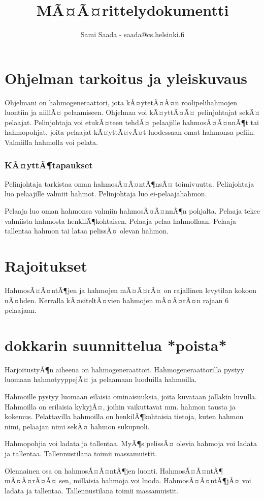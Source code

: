 \documentclass[gradu,emptyfirstpagenumber]{tktltiki}
\begin{document}
\title{MÃ¤Ã¤rittelydokumentti}
\author{Sami Saada - saada@cs.helsinki.fi}

\pagestyle{headings}

\maketitle

\chapter{Ohjelman tarkoitus ja yleiskuvaus}

Ohjelmani on hahmogeneraattori, jota kÃ¤ytetÃ¤Ã¤n roolipelihahmojen luontiin ja niillÃ¤ pelaamiseen. Ohjelmaa voi kÃ¤yttÃ¤Ã¤ pelinjohtajat sekÃ¤ pelaajat. Pelinjohtaja voi etukÃ¤teen tehdÃ¤ pelaajille hahmosÃ¤Ã¤nnÃ¶t tai hahmopohjat, joita pelaajat kÃ¤yttÃ¤vÃ¤t luodessaan omat hahmonsa peliin. Valmiilla hahmolla voi pelata.

\subsection{KÃ¤yttÃ¶tapaukset}

Pelinjohtaja tarkistaa oman hahmosÃ¤Ã¤ntÃ¶nsÃ¤ toimivuutta. Pelinjohtaja luo pelaajille valmiit hahmot. Pelinjohtaja luo ei-pelaajahahmon.

Pelaaja luo oman hahmonsa valmiin hahmosÃ¤Ã¤nnÃ¶n pohjalta. Pelaaja tekee valmiista hahmosta henkilÃ¶kohtaisen. Pelaaja pelaa hahmollaan. Pelaaja tallentaa hahmon tai lataa pelissÃ¤ olevan hahmon.

\chapter{Rajoitukset}

HahmosÃ¤Ã¤ntÃ¶jen ja hahmojen mÃ¤Ã¤rÃ¤ on rajallinen levytilan kokoon nÃ¤hden. Kerralla kÃ¤siteltÃ¤vien hahmojen mÃ¤Ã¤rÃ¤n rajaan 6 pelaajaan.

\chapter{dokkarin suunnittelua *poista*}

HarjoitustyÃ¶n aiheena on hahmogeneraattori. Hahmogeneraattorilla pystyy luomaan hahmotyyppejÃ¤ ja pelaamaan luoduilla hahmoilla.

Hahmoille pystyy luomaan eilaisia ominaisuuksia, joita kuvataan jollakin luvulla. Hahmoilla on erilaisia kykyjÃ¤, joihin vaikuttavat mm. hahmon tausta ja kokemus. Pelattavilla hahmoilla on henkilÃ¶kohtaisia tietoja, kuten hahmon nimi, pelaajan nimi sekÃ¤ hahmon sukupuoli.

Hahmopohjia voi ladata ja tallentaa. MyÃ¶s pelissÃ¤ olevia hahmoja voi ladata ja tallentaa. Tallennustilana toimii massamuistit.

Olennainen osa on hahmosÃ¤Ã¤ntÃ¶jen luonti. HahmosÃ¤Ã¤ntÃ¶ mÃ¤Ã¤rÃ¤Ã¤ sen, millaisia hahmoja voi luoda. HahmosÃ¤Ã¤ntÃ¶jÃ¤ voi ladata ja tallentaa. Tallennustilana toimii massamuistit.
\end{document}
